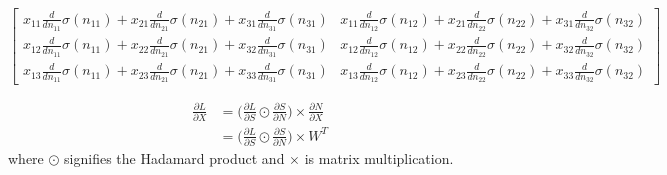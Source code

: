 \documentclass[11pt]{article}
\begin{document}
    
    $\displaystyle \left[\begin{matrix}x_{11} \frac{d}{d n_{11}} \sigma{\left(n_{11} \right)} + x_{21} \frac{d}{d n_{21}} \sigma{\left(n_{21} \right)} + x_{31} \frac{d}{d n_{31}} \sigma{\left(n_{31} \right)} & x_{11} \frac{d}{d n_{12}} \sigma{\left(n_{12} \right)} + x_{21} \frac{d}{d n_{22}} \sigma{\left(n_{22} \right)} + x_{31} \frac{d}{d n_{32}} \sigma{\left(n_{32} \right)}\\x_{12} \frac{d}{d n_{11}} \sigma{\left(n_{11} \right)} + x_{22} \frac{d}{d n_{21}} \sigma{\left(n_{21} \right)} + x_{32} \frac{d}{d n_{31}} \sigma{\left(n_{31} \right)} & x_{12} \frac{d}{d n_{12}} \sigma{\left(n_{12} \right)} + x_{22} \frac{d}{d n_{22}} \sigma{\left(n_{22} \right)} + x_{32} \frac{d}{d n_{32}} \sigma{\left(n_{32} \right)}\\x_{13} \frac{d}{d n_{11}} \sigma{\left(n_{11} \right)} + x_{23} \frac{d}{d n_{21}} \sigma{\left(n_{21} \right)} + x_{33} \frac{d}{d n_{31}} \sigma{\left(n_{31} \right)} & x_{13} \frac{d}{d n_{12}} \sigma{\left(n_{12} \right)} + x_{23} \frac{d}{d n_{22}} \sigma{\left(n_{22} \right)} + x_{33} \frac{d}{d n_{32}} \sigma{\left(n_{32} \right)}\end{matrix}\right]$

    
    \[
\begin{aligned}
\frac{\partial L}{\partial X} &= \bigg( \frac{\partial L}{\partial S} \odot  \frac{\partial S}{\partial N} \bigg) \times \frac{\partial N}{\partial X}  \\
&= \bigg( \frac{\partial L}{\partial S} \odot \frac{\partial S}{\partial N} \bigg) \times W^T 
\end{aligned}
\] where \(\odot\) signifies the Hadamard product and \(\times\) is
matrix multiplication.
\end{document}
